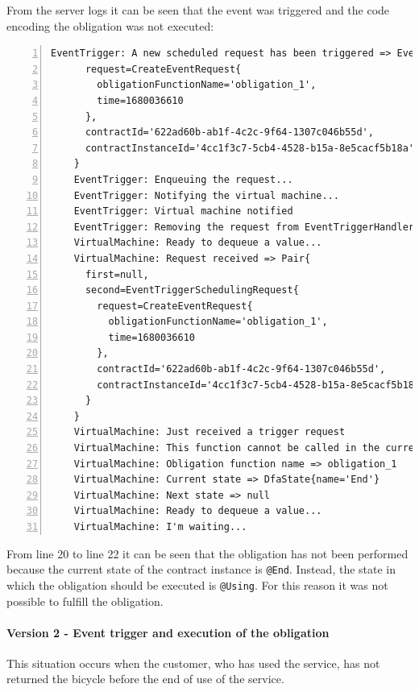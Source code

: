 From the server logs it can be seen that the event was triggered and the code encoding the obligation was 
not executed:
{
  \small
  \begin{Verbatim}[numbers=left,xleftmargin=1cm,firstnumber=1,breaklines=true,breakanywhere=true,tabsize=2]
    EventTrigger: A new scheduled request has been triggered => EventTriggerSchedulingRequest{
      request=CreateEventRequest{
        obligationFunctionName='obligation_1', 
        time=1680036610
      }, 
      contractId='622ad60b-ab1f-4c2c-9f64-1307c046b55d', 
      contractInstanceId='4cc1f3c7-5cb4-4528-b15a-8e5cacf5b18a'
    }
    EventTrigger: Enqueuing the request...
    EventTrigger: Notifying the virtual machine...
    EventTrigger: Virtual machine notified
    EventTrigger: Removing the request from EventTriggerHandler...
    VirtualMachine: Ready to dequeue a value...
    VirtualMachine: Request received => Pair{
      first=null, 
      second=EventTriggerSchedulingRequest{
        request=CreateEventRequest{
          obligationFunctionName='obligation_1', 
          time=1680036610
        }, 
        contractId='622ad60b-ab1f-4c2c-9f64-1307c046b55d', 
        contractInstanceId='4cc1f3c7-5cb4-4528-b15a-8e5cacf5b18a'
      }
    }
    VirtualMachine: Just received a trigger request
    VirtualMachine: This function cannot be called in the current state
    VirtualMachine: Obligation function name => obligation_1
    VirtualMachine: Current state => DfaState{name='End'}
    VirtualMachine: Next state => null
    VirtualMachine: Ready to dequeue a value...
    VirtualMachine: I'm waiting...
  \end{Verbatim}
}

From line 20 to line 22 it can be seen that the obligation has not been performed because the current 
state of the contract instance is \verb|@End|. Instead, the state in which the obligation should be 
executed is \verb|@Using|. For this reason it was not possible to fulfill the obligation.

\paragraph{Version 2 - Event trigger and execution of the obligation}

This situation occurs when the customer, who has used the service, has not returned the bicycle before the 
end of use of the service.

